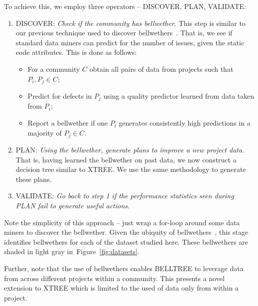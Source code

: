 \documentclass[10pt,journal,compsoc]{IEEEtran}
\newcommand{\bi}{\begin{itemize}} %
\newcommand{\ei}{\end{itemize}}
\newcommand{\be}{\begin{enumerate}}
\newcommand{\ee}{\end{enumerate}}
\newcommand{\fig}[1]{Figure~\ref{fig:#1}}
\begin{document}
To achieve this, we employ three operators -- DISCOVER, PLAN, VALIDATE:
    \be
    \item DISCOVER: {\em Check if the community has bellwether.} 
    This step is similar to our previous technique used to discover bellwethers~\cite{krishna16}. That is, we see if standard data miners can predict for the number of issues, given the static code attributes. This is done as follows:~ 
    \bi 
    \item
    For a community $C$ obtain all pairs of data from
    projects such that $P_i, P_j \in C$;
    \item
    Predict for defects in $P_j$ using a quality predictor learned from data taken from $P_i$;
    \item
    Report a bellwether if one $P_i$  generates consistently high predictions in a majority of $P_j \in C$.
    \ei
    \item PLAN: {\em Using the bellwether, generate plans to improve a new project data.} That is,
    having learned the bellwether on past data, we now construct a decision tree similar to XTREE. We use the same methodology to generate these plans.
    \item VALIDATE: {\em Go back  to step 1 if the performance statistics seen during PLAN fail to generate useful actions}.
    \ee
   Note the simplicity of this approach -- just wrap a for-loop around some data miners to discover the bellwether. Given the ubiquity of bellwethers~\cite{krishna17b}, this stage identifies bellwethers for each of the dataset studied here. These bellwethers are shaded in \colorbox{lavenderpink}{light gray} in~\fig{datasets}. 

Further, note that the use of bellwethers enables BELLTREE to leverage data from across different projects within a community. This presents a novel extension to XTREE which is limited to the used of data only from within a project.

\end{document}
